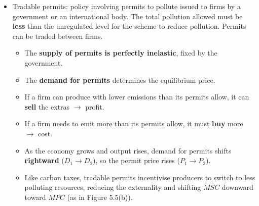 \documentclass[a4paper,12pt]{article}
\begin{document}
\begin{itemize}
\begin{itemize}
\begin{center}
\end{center}
 \item Tradable permits: policy involving permits to pollute issued to firms by a government or an international body. The total pollution allowed must be \textbf{less} than the unregulated level for the scheme to reduce pollution. Permits can be traded between firms.
    \begin{itemize}
      \item The \textbf{supply of permits is perfectly inelastic}, fixed by the government.
      \item The \textbf{demand for permits} determines the equilibrium price.
      \item If a firm can produce with lower emissions than its permits allow, it can \textbf{sell} the extras $\to$ profit.
      \item If a firm needs to emit more than its permits allow, it must \textbf{buy} more $\to$ cost.
      \item As the economy grows and output rises, demand for permits shifts \textbf{rightward} ($D_1 \to D_2$), so the permit price rises ($P_1 \to P_2$).
      \item Like carbon taxes, tradable permits incentivise producers to switch to less polluting resources, reducing the externality and shifting $MSC$ downward toward $MPC$ (as in Figure 5.5(b)).
    \end{itemize}


\end{itemize}
\end{itemize}
\end{document}
